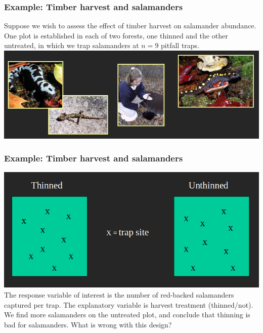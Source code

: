 \documentclass[color=usenames,dvipsnames]{beamer}\usepackage[]{graphicx}\usepackage[]{xcolor}
\begin{document}
\begin{frame}
  \frametitle{Example: Timber harvest and salamanders}
  Suppose we wish to assess the effect of timber harvest on salamander
  abundance.  One plot is established in each of two forests, one
  thinned and the other untreated, in which we trap salamanders at $n=9$
  pitfall traps.  %
  \vfill
  \centering
  \includegraphics[width=\textwidth]{salamanders} \\
\end{frame}


\begin{frame}
  \frametitle{Example: Timber harvest and salamanders}
  \includegraphics[width=\textwidth]{salamander-design} \\
  \vfill
  The response variable of interest is the number of red-backed
  salamanders captured per trap.  The explanatory variable is harvest
  treatment (thinned/not). We find more salamanders on the untreated
  plot, and conclude that thinning is bad for salamanders.  What is
  wrong with this design?  
\end{frame}
\end{document}
